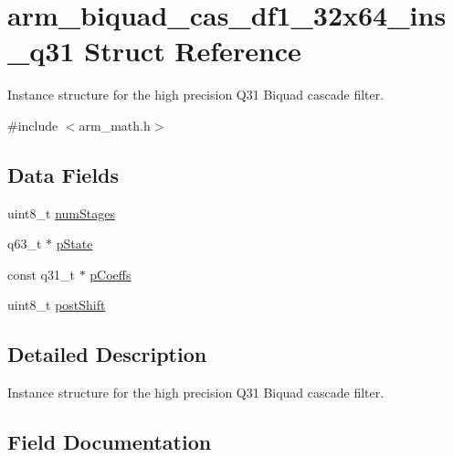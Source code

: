 \hypertarget{structarm__biquad__cas__df1__32x64__ins__q31}{}\section{arm\+\_\+biquad\+\_\+cas\+\_\+df1\+\_\+32x64\+\_\+ins\+\_\+q31 Struct Reference}
\label{structarm__biquad__cas__df1__32x64__ins__q31}


Instance structure for the high precision Q31 Biquad cascade filter.  




{\ttfamily \#include $<$arm\+\_\+math.\+h$>$}

\subsection*{Data Fields}
\begin{DoxyCompactItemize}
\item 
uint8\+\_\+t \mbox{\hyperlink{structarm__biquad__cas__df1__32x64__ins__q31_a3615af038f56917909e0370c11bc2ec7}{num\+Stages}}
\item 
q63\+\_\+t $\ast$ \mbox{\hyperlink{structarm__biquad__cas__df1__32x64__ins__q31_adefeb77301cc04e4d7d22f323029d588}{p\+State}}
\item 
const q31\+\_\+t $\ast$ \mbox{\hyperlink{structarm__biquad__cas__df1__32x64__ins__q31_a80e7fdf4747dbda8eadb2663fb4be317}{p\+Coeffs}}
\item 
uint8\+\_\+t \mbox{\hyperlink{structarm__biquad__cas__df1__32x64__ins__q31_a74050e9f36542bd56f4052381a82ae8f}{post\+Shift}}
\end{DoxyCompactItemize}


\subsection{Detailed Description}
Instance structure for the high precision Q31 Biquad cascade filter. 

\subsection{Field Documentation}
\mbox{\label{structarm__biquad__cas__df1__32x64__ins__q31_a3615af038f56917909e0370c11bc2ec7}} 
